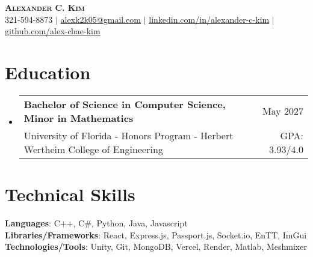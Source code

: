 \documentclass[letterpaper,11pt]{article}
\makeatletter
\newcommand{\resumeSubheading}[4]{
  \vspace{-2pt}\item
    \begin{tabular*}{\textwidth}[t]{l@{\extracolsep{\fill}}r}
      \small\textbf{#1} & #2 \\
      {\small#3} & {\small #4} \\
    \end{tabular*}\vspace{-7pt}
}
\newcommand{\resumeSubHeadingListStart}{\begin{itemize}[leftmargin=0in, label={}]}
\newcommand{\resumeSubHeadingListEnd}{\end{itemize}}
\makeatother
\begin{document}

\begin{center}
    \textbf{\Huge \scshape Alexander C. Kim} \\ \vspace{1pt}
    \small 321-594-8873 $|$ \href{mailto:x@x.com}{{alexk2k05@gmail.com}} $|$ 
    \href{https://linkedin.com/in/alexander-c-kim}{{linkedin.com/in/alexander-c-kim}} $|$
    \href{https://github.com/alex-chae-kim}{{github.com/alex-chae-kim}}
\end{center}


\section{\textbf{Education}}
  \resumeSubHeadingListStart
    \resumeSubheading
      {Bachelor of Science in Computer Science, Minor in Mathematics}{May 2027}
      {University of Florida - Honors Program - Herbert Wertheim College of Engineering}{GPA: 3.93/4.0}
  \resumeSubHeadingListEnd

\section{\textbf{Technical Skills}}
 \begin{itemize}[leftmargin=0in, label={}]
    \small{\item{
     \textbf{Languages}{: C++, C\#, Python, Java, Javascript} \\
     \textbf{Libraries/Frameworks}{: React, Express.js, Passport.js, Socket.io, EnTT, ImGui} \\
     \textbf{Technologies/Tools}{: Unity, Git, MongoDB, Vercel, Render, Matlab, Meshmixer} \\

    }}
 \end{itemize}
\end{document}
